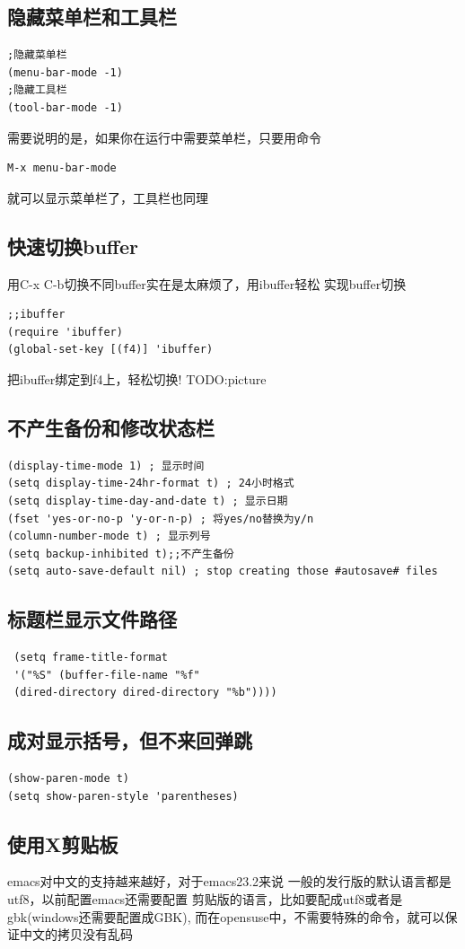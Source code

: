 \documentclass[adobefonts]{ctexart}
\begin{document}
\subsection{隐藏菜单栏和工具栏} %
\begin{verbatim}
;隐藏菜单栏
(menu-bar-mode -1)
;隐藏工具栏
(tool-bar-mode -1)
\end{verbatim}
需要说明的是，如果你在运行中需要菜单栏，只要用命令
\begin{verbatim}
M-x menu-bar-mode
\end{verbatim}
就可以显示菜单栏了，工具栏也同理
\subsection{快速切换buffer}
用C-x C-b切换不同buffer实在是太麻烦了，用ibuffer轻松
实现buffer切换
\begin{verbatim}
;;ibuffer
(require 'ibuffer)
(global-set-key [(f4)] 'ibuffer)
\end{verbatim}
把ibuffer绑定到f4上，轻松切换!
TODO:picture
\subsection{不产生备份和修改状态栏}
\begin{verbatim}
(display-time-mode 1) ; 显示时间
(setq display-time-24hr-format t) ; 24小时格式
(setq display-time-day-and-date t) ; 显示日期
(fset 'yes-or-no-p 'y-or-n-p) ; 将yes/no替换为y/n
(column-number-mode t) ; 显示列号
(setq backup-inhibited t);;不产生备份
(setq auto-save-default nil) ; stop creating those #autosave# files
\end{verbatim}

\subsection{标题栏显示文件路径}
\begin{verbatim}
 (setq frame-title-format  
 '("%S" (buffer-file-name "%f"  
 (dired-directory dired-directory "%b"))))  
\end{verbatim}

\subsection{成对显示括号，但不来回弹跳}
\begin{verbatim}
(show-paren-mode t)
(setq show-paren-style 'parentheses)
\end{verbatim}

\subsection{使用X剪贴板}
emacs对中文的支持越来越好，对于emacs23.2来说
一般的发行版的默认语言都是utf8，以前配置emacs还需要配置
剪贴版的语言，比如要配成utf8或者是gbk(windows还需要配置成GBK),
而在opensuse中，不需要特殊的命令，就可以保证中文的拷贝没有乱码
\end{document}
